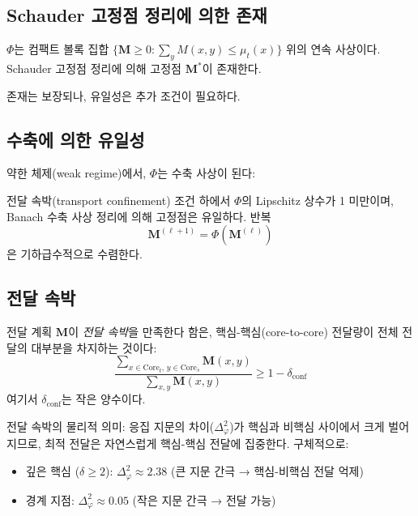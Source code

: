 \subsection{Schauder 고정점 정리에 의한 존재}

\begin{theorem}[전달 핵 존재]
\label{thm:transport-existence}
$\Phi$는 컴팩트 볼록 집합 $\{\mathbf{M} \geq 0 : \sum_y M(x,y) \leq \mu_t(x)\}$ 위의 연속 사상이다. Schauder 고정점 정리에 의해 고정점 $\mathbf{M}^*$이 존재한다.
\end{theorem}

존재는 보장되나, 유일성은 추가 조건이 필요하다.

\subsection{수축에 의한 유일성}

약한 체제(weak regime)에서, $\Phi$는 수축 사상이 된다:

\begin{theorem}
\label{thm:contraction-uniqueness}
전달 속박(transport confinement) 조건 하에서 $\Phi$의 Lipschitz 상수가 1 미만이며, Banach 수축 사상 정리에 의해 고정점은 유일하다. 반복
\begin{equation}
    \mathbf{M}^{(\ell+1)} = \Phi(\mathbf{M}^{(\ell)})
    \label{eq:banach-iteration}
\end{equation}
은 기하급수적으로 수렴한다.
\end{theorem}

\subsection{전달 속박}

\begin{definition}[전달 속박]
\label{def:transport-confinement}
전달 계획 $\mathbf{M}$이 \emph{전달 속박}을 만족한다 함은, 핵심-핵심(core-to-core) 전달량이 전체 전달의 대부분을 차지하는 것이다:
\begin{equation}
    \frac{\sum_{x \in \mathrm{Core}_t,\, y \in \mathrm{Core}_s} \mathbf{M}(x,y)}{\sum_{x,y} \mathbf{M}(x,y)} \geq 1 - \delta_{\mathrm{conf}}
    \label{eq:confinement}
\end{equation}
여기서 $\delta_{\mathrm{conf}}$는 작은 양수이다.
\end{definition}

전달 속박의 물리적 의미: 응집 지문의 차이($\Delta_\varphi^2$)가 핵심과 비핵심 사이에서 크게 벌어지므로, 최적 전달은 자연스럽게 핵심-핵심 전달에 집중한다. 구체적으로:
\begin{itemize}
    \item 깊은 핵심 ($\delta \geq 2$): $\Delta_\varphi^2 \approx 2.38$ (큰 지문 간극 → 핵심-비핵심 전달 억제)
    \item 경계 지점: $\Delta_\varphi^2 \approx 0.05$ (작은 지문 간극 → 전달 가능)
\end{itemize}

